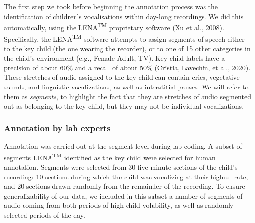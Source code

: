 \documentclass[english,,man]{apa6}
\begin{document}
The first step we took before beginning the annotation process was the identification of children's vocalizations within day-long recordings. We did this automatically, using the LENA\textsuperscript{TM} proprietary software (Xu et al., 2008). Specifically, the LENA\textsuperscript{TM} software attempts to assign segments of speech either to the key child (the one wearing the recorder), or to one of 15 other categories in the child's environment (e.g., Female-Adult, TV). Key child labels have a precision of about 60\% and a recall of about 50\% (Cristia, Lavechin, et al., 2020). These stretches of audio assigned to the key child can contain cries, vegetative sounds, and linguistic vocalizations, as well as interstitial pauses. We will refer to them as \emph{segments}, to highlight the fact that they are stretches of audio segmented out as belonging to the key child, but they may not be individual vocalizations.

\hypertarget{annotation-by-lab-experts}{%
\subsubsection{Annotation by lab experts}\label{annotation-by-lab-experts}}

Annotation was carried out at the segment level during lab coding. A subset of segments LENA\textsuperscript{TM} identified as the key child were selected for human annotation. Segments were selected from 30 five-minute sections of the child's recording: 10 sections during which the child was vocalizing at their highest rate, and 20 sections drawn randomly from the remainder of the recording. To ensure generalizability of our data, we included in this subset a number of segments of audio coming from both periods of high child volubility, as well as randomly selected periods of the day.
\end{document}
